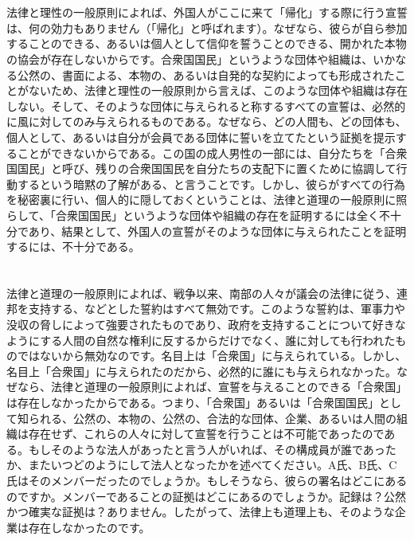 \documentclass[dvipdfmx, uplatex, tate, landscape]{utbook}
\begin{document}
\chapter{}

法律と理性の一般原則によれば、外国人がここに来て「帰化」する際に行う宣誓は、何の効力もありません（「帰化」と呼ばれます）。なぜなら、彼らが自ら参加することのできる、あるいは個人として信仰を誓うことのできる、開かれた本物の協会が存在しないからです。合衆国国民」というような団体や組織は、いかなる公然の、書面による、本物の、あるいは自発的な契約によっても形成されたことがないため、法律と理性の一般原則から言えば、このような団体や組織は存在しない。そして、そのような団体に与えられると称するすべての宣誓は、必然的に風に対してのみ与えられるものである。なぜなら、どの人間も、どの団体も、個人として、あるいは自分が会員である団体に誓いを立てたという証拠を提示することができないからである。この国の成人男性の一部には、自分たちを「合衆国国民」と呼び、残りの合衆国国民を自分たちの支配下に置くために協調して行動するという暗黙の了解がある、と言うことです。しかし、彼らがすべての行為を秘密裏に行い、個人的に隠しておくということは、法律と道理の一般原則に照らして、「合衆国国民」というような団体や組織の存在を証明するには全く不十分であり、結果として、外国人の宣誓がそのような団体に与えられたことを証明するには、不十分である。

\chapter{}

法律と道理の一般原則によれば、戦争以来、南部の人々が議会の法律に従う、連邦を支持する、などとした誓約はすべて無効です。このような誓約は、軍事力や没収の脅しによって強要されたものであり、政府を支持することについて好きなようにする人間の自然な権利に反するからだけでなく、誰に対しても行われたものではないから無効なのです。名目上は「合衆国」に与えられている。しかし、名目上「合衆国」に与えられたのだから、必然的に誰にも与えられなかった。なぜなら、法律と道理の一般原則によれば、宣誓を与えることのできる「合衆国」は存在しなかったからである。つまり、「合衆国」あるいは「合衆国国民」として知られる、公然の、本物の、公然の、合法的な団体、企業、あるいは人間の組織は存在せず、これらの人々に対して宣誓を行うことは不可能であったのである。もしそのような法人があったと言う人がいれば、その構成員が誰であったか、またいつどのようにして法人となったかを述べてください。A氏、B氏、C氏はそのメンバーだったのでしょうか。もしそうなら、彼らの署名はどこにあるのですか。メンバーであることの証拠はどこにあるのでしょうか。記録は？公然かつ確実な証拠は？ありません。したがって、法律上も道理上も、そのような企業は存在しなかったのです。
\end{document}
